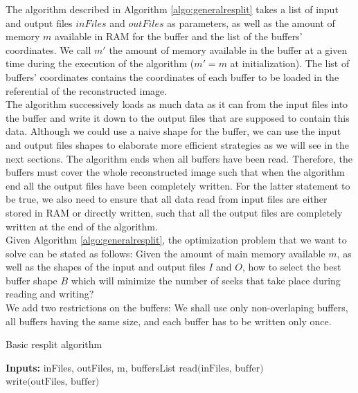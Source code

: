 \documentclass[conference]{IEEEtran}
\begin{document}
The algorithm described in Algorithm \ref{algo:generalresplit} takes a list of input and output files $inFiles$ and $outFiles$ as parameters, as well as the amount of memory $m$ available in RAM for the buffer and the list of the buffers' coordinates. We call $m'$ the amount of memory available in the buffer at a given time during the execution of the algorithm ($m'=m$ at initialization). The list of buffers' coordinates contains the coordinates of each buffer to be loaded in the referential of the reconstructed image. \\

The algorithm successively loads as much data as it can from the input files into the buffer and write it down to the output files that are supposed to contain this data.
Although we could use a naive shape for the buffer, we can use the input and output files shapes to elaborate more efficient strategies as we will see in the next sections.
The algorithm ends when all buffers have been read.
Therefore, the buffers must cover the whole reconstructed image such that when the algorithm end all the output files have been completely written.
For the latter statement to be true, we also need to ensure that all data read from input files are either stored in RAM or directly written, such that all the output files are completely written at the end of the algorithm. \\

Given Algorithm \ref{algo:generalresplit}, the optimization problem that we want to solve can be stated as follows:
Given the amount of main memory available $m$, as well as the shapes of the input and output files $I$ and $O$, how to select the best buffer shape $B$ which will minimize the number of seeks that take place during reading and writing? \\

We add two restrictions on the buffers: We shall use only non-overlaping buffers, all buffers having the same size, and each buffer has to be written only once.

\begin{algorithm}[H]
  \caption{Basic resplit algorithm}
  \label{algo:generalresplit}
  \begin{algorithmic}
    \STATE \textbf{Inputs:} {inFiles, outFiles, m, buffersList}
      \STATE $\textrm{read(inFiles, buffer)}$
      \STATE $\textrm{write(outFiles, buffer)}$
    \ENDFOR

  \end{algorithmic}
\end{algorithm}
\end{document}
